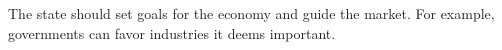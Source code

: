 The state should set goals for the economy and guide the market.
For example, governments can favor industries it deems important.